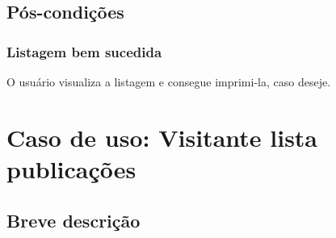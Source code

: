 \documentclass[11pt, a4paper,oneside]{book}
\begin{document}
%
%
%
%

\section{Pós-condições}

\subsection{Listagem bem sucedida}

O usuário visualiza a listagem e consegue imprimi-la, caso deseje.

%

\chapter[Caso de Uso]{Caso de uso: \bf Visitante lista publicações}
\label{cap:casodeuso}	

\section{Breve descrição}
\end{document}
